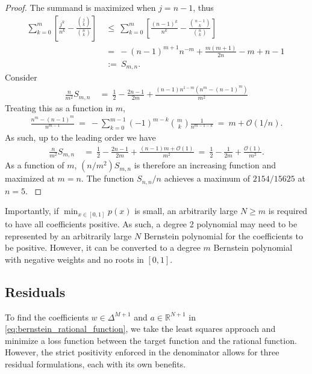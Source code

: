 \documentclass{article}
\begin{document}
\begin{proof}
{
    The summand is maximized when $j=n-1$, thus
    \begin{align}
        \sum_{k=0}^{m} \left[ \frac{j^k}{n^k} - \frac{\binom{j}{k}}{\binom{n}{k}} \right]\ &\leq\ \sum_{k=0}^{m} \left[\frac{(n-1)^k}{n^k} - \frac{\binom{n-1}{k}}{\binom{n}{k}} \right]\\\
        &=\ -(n-1)^{m+1} n^{-m}+\frac{m (m+1)}{2 n}-m+n-1\ \\
        &:=\ S_{m,n}.
    \end{align}
}
{
    Consider
    \begin{align}
        \frac{n}{m^2} S_{m,n}\ &=\ \frac{1}{2}-\frac{2n - 1}{2m} + \frac{(n-1) n^{1-m} \left(n^m-(n-1)^m\right)}{m^2}
    \end{align}
    Treating this as a function in $m$,
    \begin{eqnarray}
        \frac{n^m - (n - 1)^m}{n^{m-1}}\ =\ -\sum_{k=0}^{m-1}(-1)^{m-k}\binom{m}{k}\frac{1}{n^{m-1-k}}\ =\ m + \mathcal{O}(1/n).
    \end{eqnarray}
    As such, up to the leading order we have
    \begin{align}
        \frac{n}{m^2}S_{m,n}\ &=\ \frac{1}{2} - \frac{2n-1}{2m} + \frac{(n-1)m + \mathcal{O}(1)}{m^2}\ =\ \frac{1}{2} - \frac{1}{2m} + \frac{\mathcal{O}(1)}{m^2}.
    \end{align}
    As a function of $m$, $(n/m^2)S_{m,n}$ is therefore an increasing function and maximized at $m=n$. The function $S_{n,n}/n$ achieves a maximum of $2154/15625$ at $n=5$. 
}
\end{proof}

{
Importantly, if $\min_{x\in[0,1]}p(x)$ is small, an arbitrarily large $N\geq m$ is required to have all coefficients positive. As such, a degree 2 polynomial may need to be represented by an arbitrarily large $N$ Bernstein polynomial for the coefficients to be positive. However, it can be converted to a degree $m$ Bernstein polynomial with negative weights and no roots in $[0,1]$.
}

\subsection{Residuals}\label{sec:residuals}
To find the coefficients $w\in\Delta^{M+1}$ and $a\in\mathbb{R}^{N+1}$ in \ref{eq:bernstein_rational_function}, we take the least squares approach and minimize a loss function between the target function and the rational function. However, the strict positivity enforced in the denominator allows for three residual formulations, each with its own benefits.
\end{document}
